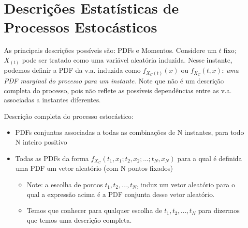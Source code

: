 \documentclass{article}
\begin{document}
\setlength{\abovedisplayskip}{12pt}
\setlength{\belowdisplayskip}{12pt}
\setlength{\abovedisplayshortskip}{0pt}
\setlength{\belowdisplayshortskip}{0pt}
\setlength{\jot}{1pt}

\section{Descrições Estatísticas de Processos Estocásticos}
As principais descrições possíveis são: PDFs e Momentos. Considere um $t$ fixo; $X_{(t)}$ pode ser
tratado como uma variável aleatória induzida. Nesse instante, podemos definir a PDF da v.a.
induzida como $f_{X_C(t)}(x)$ ou $f_{X_C}(t, x)$: \textit{uma PDF marginal do processo para um
instante}. Note que não é um descrição completa do processo, pois não reflete as possíveis
dependências entre as v.a. associadas a instantes diferentes.

Descrição completa do processo estocástico:
\begin{itemize}
    \item PDFs conjuntas associadas a todas as combinações de N instantes, para todo N inteiro
        positivo
    \item Todas as PDFs da forma $f_{X_C}(t_1,x_1;t_2,x_2;\ldots;t_N,x_N)$ para a qual é definida
        uma PDF um vetor aleatório (com N pontos fixados)
        \begin{itemize}
            \item Note: a escolha de pontos $t_1,t_2,\ldots,t_N$, induz um vetor aleatório para o
                qual a expressão acima é a PDF conjunta desse vetor aleatório.
            \item Temos que conhecer para qualquer escolha de $t_1,t_2,\ldots,t_N$ para dizermos
                que temos uma descrição completa.
        \end{itemize}
\end{itemize}
\end{document}
